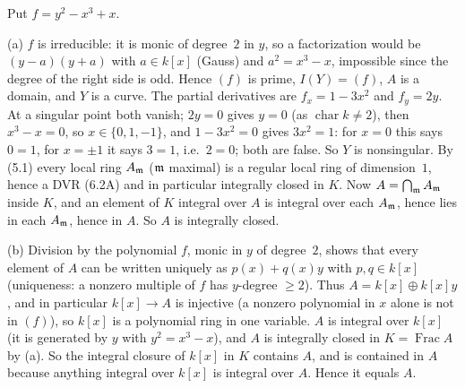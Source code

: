 \documentclass[11pt]{article}
\begin{document}
\pf
Put $f=y^2-x^3+x$.

(a) $f$ is irreducible: it is monic of degree~$2$ in $y$, so a factorization would be $(y-a)(y+a)$ with $a\in k[x]$ (Gauss) and $a^2=x^3-x$, impossible since the degree of the right side is odd. Hence $(f)$ is prime, $I(Y)=(f)$, $A$ is a domain, and $Y$ is a curve. The partial derivatives are $f_x=1-3x^2$ and $f_y=2y$. At a singular point both vanish; $2y=0$ gives $y=0$ (as $\operatorname{char}k\ne2$), then $x^3-x=0$, so $x\in\{0,1,-1\}$, and $1-3x^2=0$ gives $3x^2=1$: for $x=0$ this says $0=1$, for $x=\pm1$ it says $3=1$, i.e.\ $2=0$; both are false. So $Y$ is nonsingular. By (5.1) every local ring $A_{\mathfrak m}$ ($\mathfrak m$ maximal) is a regular local ring of dimension~$1$, hence a DVR (6.2A) and in particular integrally closed in $K$. Now $A=\bigcap_{\mathfrak m}A_\mathfrak m$ inside $K$, and an element of $K$ integral over $A$ is integral over each $A_\mathfrak m$, hence lies in each $A_\mathfrak m$, hence in $A$. So $A$ is integrally closed.

(b) Division by the polynomial $f$, monic in $y$ of degree~$2$, shows that every element of $A$ can be written uniquely as $p(x)+q(x)y$ with $p,q\in k[x]$ (uniqueness: a nonzero multiple of $f$ has $y$-degree $\ge2$). Thus $A=k[x]\oplus k[x]y$, and in particular $k[x]\to A$ is injective (a nonzero polynomial in $x$ alone is not in $(f)$), so $k[x]$ is a polynomial ring in one variable. $A$ is integral over $k[x]$ (it is generated by $y$ with $y^2=x^3-x$), and $A$ is integrally closed in $K=\operatorname{Frac}A$ by (a). So the integral closure of $k[x]$ in $K$ contains $A$, and is contained in $A$ because anything integral over $k[x]$ is integral over $A$. Hence it equals $A$.
\end{document}
